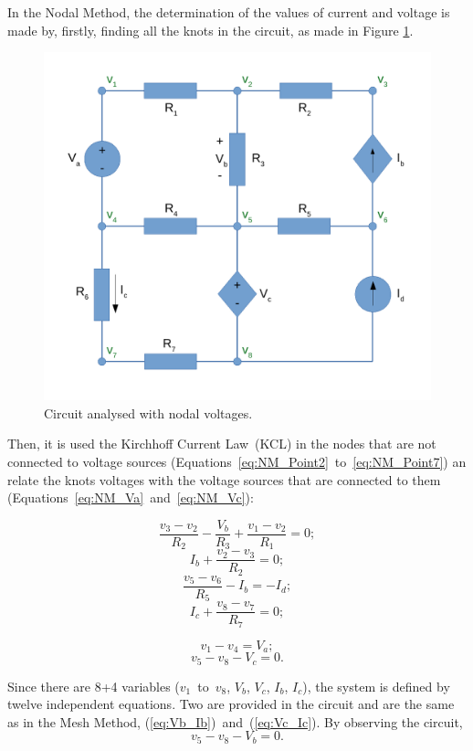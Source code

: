 In the Nodal Method, the determination of the values of current and voltage is made by, firstly, finding all the knots in the circuit, as made in Figure \ref{fig:Circuit_Nodal}.

\begin{figure}[h] \centering
\includegraphics[width=0.5\linewidth]{CircuitNodal.pdf}
\caption{Circuit analysed with nodal voltages.}
\label{fig:Circuit_Nodal}
\end{figure}

Then, it is used the Kirchhoff Current Law~(KCL) in the nodes that are not connected to voltage sources (Equations~\ref{eq:NM_Point2}~to~\ref{eq:NM_Point7}) an relate the knots voltages with the voltage sources that are connected to them (Equations~\ref{eq:NM_Va}~and~\ref{eq:NM_Vc}):

\begin{equation}
  \frac{v_3-v_2}{R_2} - \frac{V_b}{R_3} + \frac{v_1-v_2}{R_1} = 0;
  \label{eq:NM_Point2}
\end{equation}
\begin{equation}
  I_b + \frac{v_2-v_3}{R_2} = 0;	
  \label{eq:NM_Point3}
\end{equation}
\begin{equation}
  \frac{v_5-v_6}{R_5} - I_b = -I_d;
  \label{eq:NM_Point6}
\end{equation}
\begin{equation}
  I_c + \frac{v_8-v_7}{R_7} = 0;
  \label{eq:NM_Point7}
\end{equation}

\begin{equation}
  v_1 - v_4 = V_a;
  \label{eq:NM_Va}
\end{equation}
\begin{equation}
  v_5 - v_8 - V_c = 0.
  \label{eq:NM_Vc}
\end{equation}

Since there are 8+4 variables ($v_1$~to~$v_8$, $V_b$, $V_c$, $I_b$, $I_c$), the system is defined by twelve independent equations. Two are provided in the circuit and are the same as in the Mesh Method, (\ref{eq:Vb_Ib})~and~(\ref{eq:Vc_Ic}).
By observing the circuit,
\begin{equation}
  v_5 - v_8 - V_b = 0.
  \label{eq:NM_Vb}
\end{equation}

